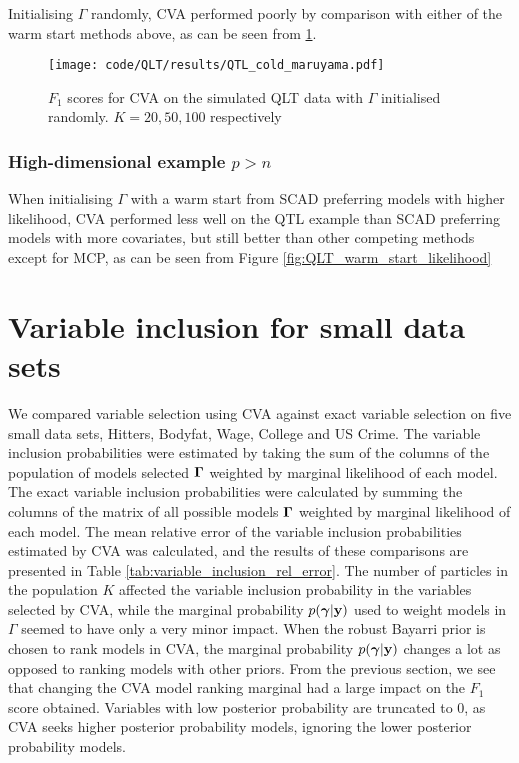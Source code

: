 \documentclass{amsart}[12pt]
\begin{document}
Initialising $\Gamma$ randomly, CVA performed poorly by comparison with either of the warm start methods
above, as can be seen from \ref{fig:QLT_cold_start}.
\begin{figure}\label{fig:QLT_cold_start}
\caption{$F_1$ scores for CVA on the simulated QLT data with $\Gamma$ initialised randomly. $K=20, 50, 100$ respectively}
\texttt{[image: code/QLT/results/QTL\_cold\_maruyama.pdf]}

\end{figure}


\subsubsection{High-dimensional example $p > n$}
When initialising $\Gamma$ with a warm start from SCAD preferring models with higher likelihood,
CVA performed less well on the QTL example than SCAD preferring models with more covariates, but still
better than other competing methods except for MCP,
as can be seen from Figure \ref{fig:QLT_warm_start_likelihood}

\section{Variable inclusion for small data sets}

We compared variable selection using CVA against exact variable selection on five small data sets,
Hitters, Bodyfat, Wage, College and US Crime. 
The variable inclusion probabilities were estimated by taking the sum of the columns of the population
of models selected ${\boldsymbol \Gamma}$
weighted by marginal likelihood of each model.
The exact variable inclusion probabilities were calculated by summing the columns of the matrix of all possible
models ${\boldsymbol \Gamma}$ weighted by marginal likelihood of each model.
The mean relative error of the variable inclusion probabilities estimated by CVA was calculated,
and the results of these comparisons are presented in Table \ref{tab:variable_inclusion_rel_error}.
The number of particles in the population $K$ affected the
variable inclusion probability in the variables selected by CVA, while the marginal probability
$p({\boldsymbol \gamma} | {\bf y})$ used to weight models in $\Gamma$ seemed to have only a very minor impact.
When the robust Bayarri prior is chosen to rank models in CVA,
the marginal probability $p({\boldsymbol \gamma} | {\bf y})$ changes a lot as opposed to ranking models with other priors.
From the previous section, we see that changing the CVA model ranking
marginal had a large impact on the $F_1$ score obtained.
Variables with low posterior probability are truncated to 0, as CVA seeks higher posterior probability models,
ignoring the lower posterior probability models.
\end{document}
